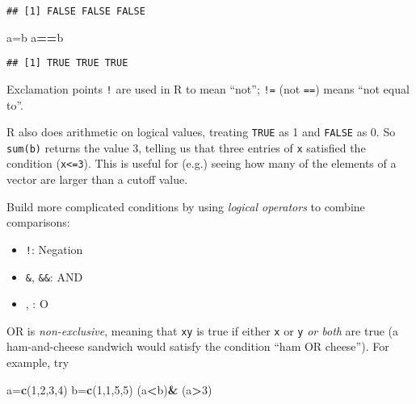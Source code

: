 \documentclass[11pt,]{article}
\newenvironment{Shaded}{\begin{snugshade}}{\end{snugshade}}
\newcommand{\KeywordTok}[1]{\textcolor[rgb]{0.13,0.29,0.53}{\textbf{#1}}}
\newcommand{\DecValTok}[1]{\textcolor[rgb]{0.00,0.00,0.81}{#1}}
\newcommand{\StringTok}[1]{\textcolor[rgb]{0.31,0.60,0.02}{#1}}
\newcommand{\OperatorTok}[1]{\textcolor[rgb]{0.81,0.36,0.00}{\textbf{#1}}}
\newcommand{\NormalTok}[1]{#1}
\providecommand{\tightlist}{%
  \setlength{\itemsep}{0pt}\setlength{\parskip}{0pt}}
\begin{document}
\begin{verbatim}
## [1] FALSE FALSE FALSE
\end{verbatim}

\begin{Shaded}
\begin{Highlighting}[]
\NormalTok{a=b}
\NormalTok{a}\OperatorTok{==}\NormalTok{b}
\end{Highlighting}
\end{Shaded}

\begin{verbatim}
## [1] TRUE TRUE TRUE
\end{verbatim}

Exclamation points \texttt{!} are used in R to mean ``not''; \texttt{!=}
(not \texttt{==}) means ``not equal to''.

R also does arithmetic on logical values, treating \texttt{TRUE} as 1
and \texttt{FALSE} as 0. So \texttt{sum(b)} returns the value 3, telling
us that three entries of \texttt{x} satisfied the condition
(\texttt{x\textless{}=3}). This is useful for (e.g.) seeing how many of
the elements of a vector are larger than a cutoff value.

Build more complicated conditions by using \emph{logical operators} to
combine comparisons:

\begin{itemize}
\tightlist
\item
  \texttt{!}: Negation
\item
  \texttt{\&}, \texttt{\&\&}: AND
\item
  \texttt{\textbar{}}, \texttt{\textbar{}\textbar{}}: O
\end{itemize}

OR is \emph{non-exclusive}, meaning that \texttt{x\textbar{}y} is true
if either \texttt{x} or \texttt{y} \emph{or both} are true (a
ham-and-cheese sandwich would satisfy the condition ``ham OR cheese'').
For example, try

\begin{Shaded}
\begin{Highlighting}[]
\NormalTok{a=}\KeywordTok{c}\NormalTok{(}\DecValTok{1}\NormalTok{,}\DecValTok{2}\NormalTok{,}\DecValTok{3}\NormalTok{,}\DecValTok{4}\NormalTok{)}
\NormalTok{b=}\KeywordTok{c}\NormalTok{(}\DecValTok{1}\NormalTok{,}\DecValTok{1}\NormalTok{,}\DecValTok{5}\NormalTok{,}\DecValTok{5}\NormalTok{)}
\NormalTok{(a}\OperatorTok{<}\NormalTok{b)}\OperatorTok{&}\StringTok{ }\NormalTok{(a}\OperatorTok{>}\DecValTok{3}\NormalTok{)}
\end{Highlighting}
\end{Shaded}
\end{document}
